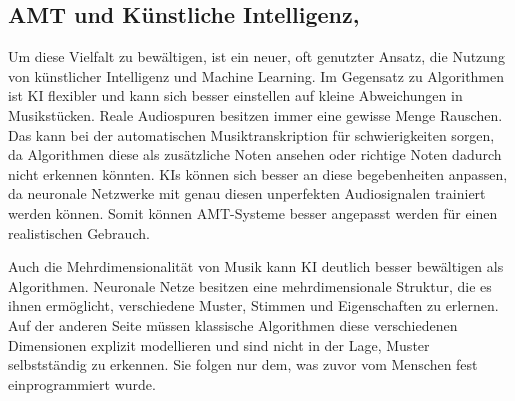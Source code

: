 \subsection{AMT und Künstliche Intelligenz,}
Um diese Vielfalt zu bewältigen, ist ein neuer, oft genutzter Ansatz,
die Nutzung von künstlicher Intelligenz und Machine Learning.
Im Gegensatz zu Algorithmen ist KI flexibler und kann sich besser
einstellen auf kleine Abweichungen in Musikstücken.
Reale Audiospuren besitzen immer eine gewisse Menge Rauschen.
Das kann bei der automatischen Musiktranskription für schwierigkeiten sorgen,
da Algorithmen diese als zusätzliche Noten ansehen oder richtige Noten dadurch nicht erkennen könnten.
KIs können sich besser an diese begebenheiten anpassen,
da neuronale Netzwerke mit genau diesen unperfekten Audiosignalen trainiert werden können.
Somit können AMT-Systeme besser angepasst werden für einen realistischen Gebrauch.

Auch die Mehrdimensionalität von Musik kann KI deutlich besser bewältigen als Algorithmen.
Neuronale Netze besitzen eine mehrdimensionale Struktur, die es ihnen ermöglicht,
verschiedene Muster, Stimmen und Eigenschaften zu erlernen.
\cite{graves2007multi}
Auf der anderen Seite müssen klassische Algorithmen diese verschiedenen Dimensionen
explizit modellieren und sind nicht in der Lage, Muster selbstständig zu erkennen.
Sie folgen nur dem, was zuvor vom Menschen fest einprogrammiert wurde.

